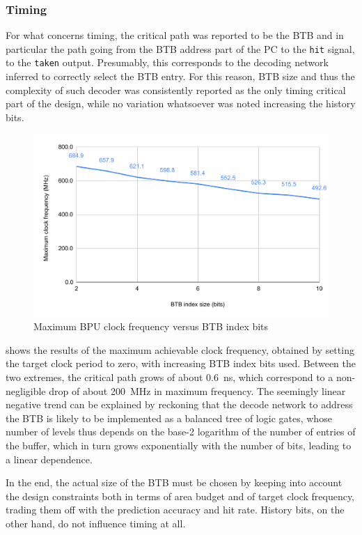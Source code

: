 \subsubsection{Timing}
For what concerns timing, the critical path was reported to be the \ac{BTB} and in particular the path going from the \ac{BTB} address part of the \ac{PC} to the \texttt{hit} signal, to the \texttt{taken} output. Presumably, this corresponds to the decoding network inferred to correctly select the \ac{BTB} entry. For this reason, \ac{BTB} size and thus the complexity of such decoder was consistently reported as the only timing critical part of the design, while no variation whatsoever was noted increasing the history bits.

\begin{figure}[hbt]
  \centering
  \includegraphics[width=\textwidth]{img/bpu_freq.pdf}
  \caption{Maximum \acs{BPU} clock frequency versus \ac{BTB} index bits}
  \label{fig:bpu_freq}
\end{figure}
 shows the results of the maximum achievable clock frequency, obtained by setting the target clock period to zero, with increasing \ac{BTB} index bits used. Between the two extremes, the critical path grows of about \SI{0.6}{ns}, which correspond to a non-negligible drop of about \SI{200}{MHz} in maximum frequency. The seemingly linear negative trend can be explained by reckoning that the decode network to address the \ac{BTB} is likely to be implemented as a balanced tree of logic gates, whose number of levels thus depends on the base-2 logarithm of the number of entries of the buffer, which in turn grows exponentially with the number of bits, leading to a linear dependence.

In the end, the actual size of the \ac{BTB} must be chosen by keeping into account the design constraints both in terms of area budget and of target clock frequency, trading them off with the prediction accuracy and hit rate. History bits, on the other hand, do not influence timing at all.

